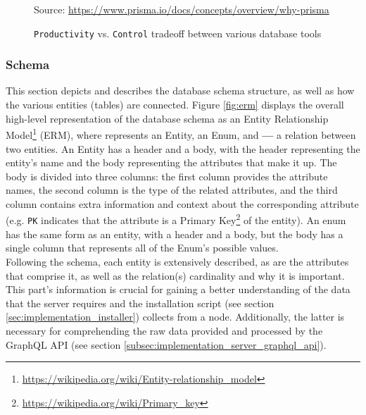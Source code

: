 \begin{figure}[htbp]
  \centering
  \def\stackalignment{r} %
  {\scriptsize Source: \url{https://www.prisma.io/docs/concepts/overview/why-prisma} }
  \caption{\texttt{Productivity}
  vs.
  \texttt{Control}
  tradeoff
  between
  various
  database
  tools}
  \label{fig:orm_productivity_control}
\end{figure}

\subsubsection{Schema}
\label{subsubsec:implementation_server_database_schema}

This section depicts and describes the database schema structure, as well as how
the various entities (tables) are connected. Figure \ref{fig:erm} displays the
overall high-level representation of the database schema as an Entity
Relationship Model\footnote{\url{https://wikipedia.org/wiki/Entity-relationship_model}}
(ERM), where  represents
an Entity,  an Enum, and
\textbf{---} a relation between two entities. An Entity has a header and a body,
with the header representing the entity's name and the body representing the
attributes that make it up. The body is divided into three columns: the first
column provides the attribute names, the second column is the type of the related
attributes, and the third column contains extra information and context about
the corresponding attribute (e.g. \texttt{PK} indicates that the attribute is a Primary
Key\footnote{\url{https://wikipedia.org/wiki/Primary_key}} of the entity). An enum
has the same form as an entity, with a header and a body, but the body has a single
column that represents all of the Enum's possible values. \\ %
Following the schema, each entity is extensively described, as are the attributes
that comprise it, as well as the relation(s) cardinality and why it is important.
\\ %
This part's information is crucial for gaining a better understanding of the data
that the server requires and the installation script (see section
\ref{sec:implementation_installer}) collects from a node. Additionally, the latter
is necessary for comprehending the raw data provided and processed by the GraphQL
API (see section \ref{subsec:implementation_server_graphql_api}).

